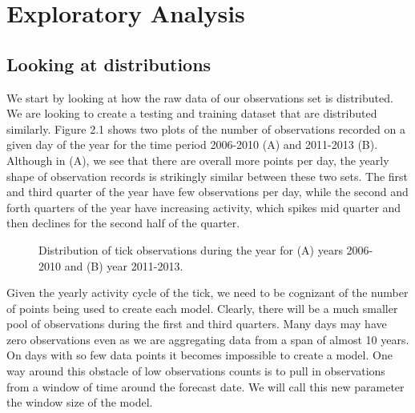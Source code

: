 
\chapter{Exploratory Analysis} %

\label{Chapter2} %




\section{Looking at distributions }

We start by looking at how the raw data of our observations set is distributed. We are looking to create a testing and training dataset that are distributed similarly. Figure 2.1 shows two plots of the number of observations recorded on a given day of the year for the time period 2006-2010 (A) and 2011-2013 (B). Although in (A), we see that there are overall more points per day, the yearly shape of observation records is strikingly similar between these two sets. The first and third quarter of the year have few observations per day, while the second and forth quarters of the year have increasing activity, which spikes mid quarter and then declines for the second half of the quarter. 

\begin{figure} [!ht]
\centerline{}
\caption{Distribution of tick observations during the year for (A) years 2006-2010 and (B) year 2011-2013. }
\label{fig6}
\end{figure}


\noindent Given the yearly activity cycle of the tick, we need to be cognizant of the number of points being used to create each model. Clearly, there will be a much smaller pool of observations during the first and third quarters. Many days may have zero observations even as we are aggregating data from a span of almost 10 years. On days with so few data points it becomes impossible to create a model. One way around this obstacle of low observations counts is to pull in observations from a window of time around the forecast date. We will call this new parameter the window size of the model. \newline

